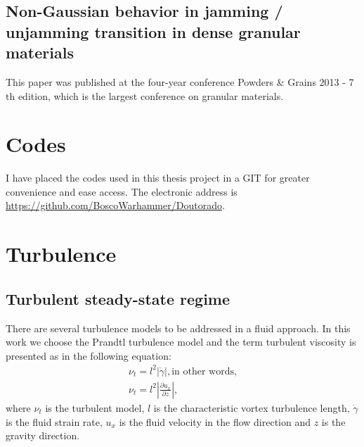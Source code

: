 \begin{apendicesenv}


\section{Non-Gaussian behavior in jamming / unjamming transition in dense granular materials}

    This paper was published at the four-year conference Powders \& Grains 2013 - 7$\textrm{th}$ edition, which is the largest conference on granular materials.



\chapter{Codes}

    I have placed the codes used in this thesis project in a GIT for greater convenience and ease access. The electronic address is \url{https://github.com/BoscoWarhammer/Doutorado}.

\chapter{Turbulence}
\label{chap:Turbulence}
\section{Turbulent steady-state regime}
    There are several turbulence models to be addressed in a fluid approach. In this work we choose the Prandtl turbulence model and the term turbulent viscosity is presented as in the following equation:
\begin{equation}
    \begin{array}{l}
        \nu_{t} = l^2\left|\dot{\gamma}\right|, \textrm{in other words,} \\
        \nu_{t} = l^2\left|\frac{\partial u_{x}}{\partial z}\right|,
    \end{array}
    \label{equ:viscosidade_turbulenta}
\end{equation}
where $\nu_{t}$ is the turbulent model, $l$ is the characteristic vortex turbulence length, $\dot{\gamma}$ is the fluid strain rate, $u_x$ is the fluid velocity in the flow direction and $z$ is the gravity direction.


\end{apendicesenv}
